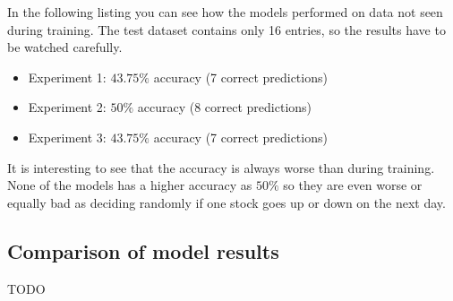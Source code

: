 In the following listing you can see how the models performed on data not seen during training. The test dataset contains only 16 entries, so the results have to be watched carefully.
\begin{itemize}
	\item Experiment 1: $43.75\%$ accuracy (7 correct predictions)
	\item Experiment 2: $50\%$ accuracy (8 correct predictions)
	\item Experiment 3: $43.75\%$ accuracy (7 correct predictions)
\end{itemize}
It is interesting to see that the accuracy is always worse than during training. None of the models has a higher accuracy as $50\%$ so they are even worse or equally bad as deciding randomly if one stock goes up or down on the next day.


\subsection{Comparison of model results}
\label{subsec:compmodelresults}	
TODO